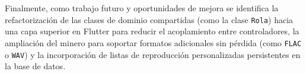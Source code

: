 Finalmente, como trabajo futuro y oportunidades de mejora se identifica la refactorización de las clases de dominio compartidas (como la clase \texttt{Rola}) hacia una capa superior en Flutter para reducir el acoplamiento entre controladores, la ampliación del minero para soportar formatos adicionales sin pérdida (como \texttt{FLAC} o \texttt{WAV}) y la incorporación de listas de reproducción personalizadas persistentes en la base de datos.